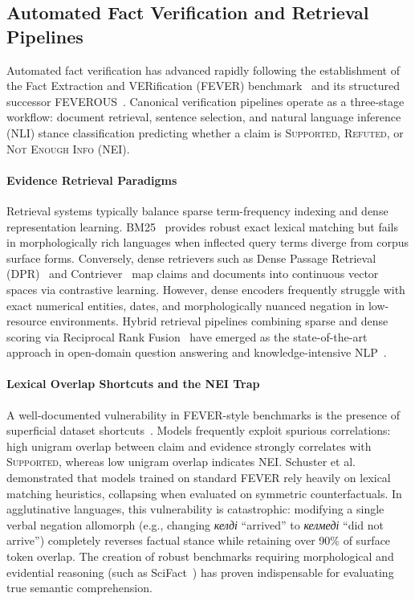 \subsection{Automated Fact Verification and Retrieval Pipelines}
Automated fact verification has advanced rapidly following the establishment of the Fact Extraction and VERification (FEVER) benchmark~\citep{thorne2018fever} and its structured successor FEVEROUS~\citep{aly2021feverous}. Canonical verification pipelines operate as a three-stage workflow: document retrieval, sentence selection, and natural language inference (NLI) stance classification predicting whether a claim is \textsc{Supported}, \textsc{Refuted}, or \textsc{Not Enough Info} (NEI).

\paragraph{Evidence Retrieval Paradigms}
Retrieval systems typically balance sparse term-frequency indexing and dense representation learning. BM25~\citep{robertson2009bm25} provides robust exact lexical matching but fails in morphologically rich languages when inflected query terms diverge from corpus surface forms. Conversely, dense retrievers such as Dense Passage Retrieval (DPR)~\citep{karpukhin2020dpr} and Contriever~\citep{izacard2021contriever} map claims and documents into continuous vector spaces via contrastive learning. However, dense encoders frequently struggle with exact numerical entities, dates, and morphologically nuanced negation in low-resource environments. Hybrid retrieval pipelines combining sparse and dense scoring via Reciprocal Rank Fusion~\citep{karpukhin2020dpr} have emerged as the state-of-the-art approach in open-domain question answering and knowledge-intensive NLP~\citep{lewis2020retrieval}.

\paragraph{Lexical Overlap Shortcuts and the NEI Trap}
A well-documented vulnerability in FEVER-style benchmarks is the presence of superficial dataset shortcuts~\citep{schuster2019fever}. Models frequently exploit spurious correlations: high unigram overlap between claim and evidence strongly correlates with \textsc{Supported}, whereas low unigram overlap indicates \textsc{NEI}. Schuster et al.~\citep{schuster2019fever} demonstrated that models trained on standard FEVER rely heavily on lexical matching heuristics, collapsing when evaluated on symmetric counterfactuals. In agglutinative languages, this vulnerability is catastrophic: modifying a single verbal negation allomorph (e.g., changing \textit{келді} ``arrived'' to \textit{келмеді} ``did not arrive'') completely reverses factual stance while retaining over 90\% of surface token overlap. The creation of robust benchmarks requiring morphological and evidential reasoning (such as SciFact~\citep{wadden2020fact}) has proven indispensable for evaluating true semantic comprehension.

